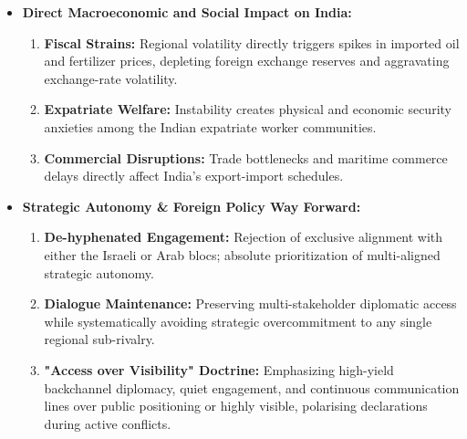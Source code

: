 \begin{itemize}
    \item \textbf{Direct Macroeconomic and Social Impact on India:}
    \begin{enumerate}
        \item \textbf{Fiscal Strains:} Regional volatility directly triggers spikes in imported oil and fertilizer prices, depleting foreign exchange reserves and aggravating exchange-rate volatility.
        \item \textbf{Expatriate Welfare:} Instability creates physical and economic security anxieties among the Indian expatriate worker communities.
        \item \textbf{Commercial Disruptions:} Trade bottlenecks and maritime commerce delays directly affect India's export-import schedules.
    \end{enumerate}

    \item \textbf{Strategic Autonomy \& Foreign Policy Way Forward:}
    \begin{enumerate}
        \item \textbf{De-hyphenated Engagement:} Rejection of exclusive alignment with either the Israeli or Arab blocs; absolute prioritization of multi-aligned strategic autonomy.
        \item \textbf{Dialogue Maintenance:} Preserving multi-stakeholder diplomatic access while systematically avoiding strategic overcommitment to any single regional sub-rivalry.
        \item \textbf{"Access over Visibility" Doctrine:} Emphasizing high-yield backchannel diplomacy, quiet engagement, and continuous communication lines over public positioning or highly visible, polarising declarations during active conflicts.
    \end{enumerate}
\end{itemize}


